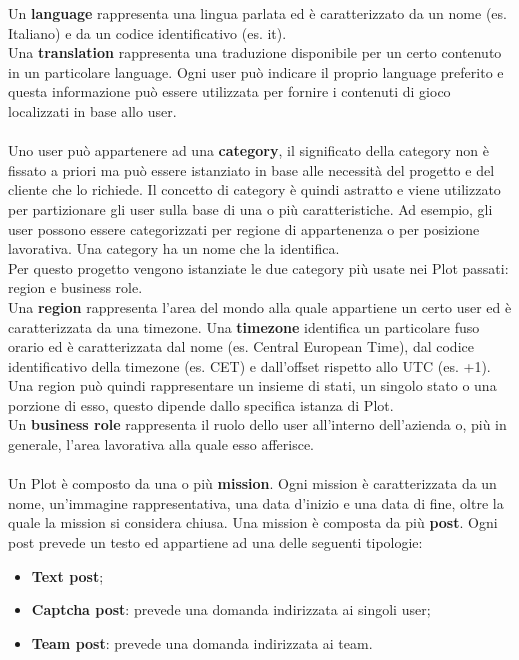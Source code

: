 Un \textbf{language} rappresenta una lingua parlata ed è caratterizzato da un nome (es. Italiano) e da un codice identificativo (es. it). \\
Una \textbf{translation} rappresenta una traduzione disponibile per un certo contenuto in un particolare language.
Ogni user può indicare il proprio language preferito e questa informazione può essere utilizzata per fornire i contenuti di gioco localizzati in base allo user.
\\ \\
Uno user può appartenere ad una \textbf{category}, il significato della category non è fissato a priori ma può essere istanziato in base alle necessità del progetto e del cliente che lo richiede. Il concetto di category è quindi astratto e viene utilizzato per partizionare gli user sulla base di una o più caratteristiche.  
Ad esempio, gli user possono essere categorizzati per regione di appartenenza o per posizione lavorativa. Una category ha un nome che la identifica. \\
Per questo progetto vengono istanziate le due category più usate nei Plot passati: region e business role.\\
Una \textbf{region} rappresenta l'area del mondo alla quale appartiene un certo user ed è caratterizzata da una timezone. Una \textbf{timezone} identifica un particolare fuso orario ed è caratterizzata dal nome (es. Central European Time), dal codice identificativo della timezone (es. CET) e dall’offset rispetto allo UTC (es. +1).
Una region può quindi rappresentare un insieme di stati, un singolo stato o una porzione di esso, questo dipende dallo specifica istanza di Plot.\\
Un \textbf{business role} rappresenta il ruolo dello user all'interno dell'azienda o, più in generale, l'area lavorativa alla quale esso afferisce.
\\ \\
Un Plot è composto da una o più \textbf{mission}. Ogni mission è caratterizzata da un nome, un'immagine rappresentativa, una data d'inizio e una data di fine, oltre la quale la mission si considera chiusa.
Una mission è composta da più \textbf{post}. Ogni post prevede un testo ed appartiene ad una delle seguenti tipologie: 
\begin{itemize}
	\item \textbf{Text post};
	\item \textbf{Captcha post}: prevede una domanda indirizzata ai singoli user;
	\item \textbf{Team post}: prevede una domanda indirizzata ai team. 
\end{itemize}

